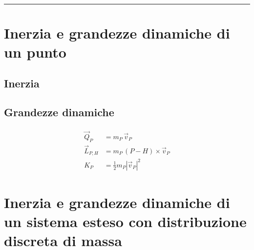 \documentclass[letterpaper,10pt,italian]{jupyterBook}
\begin{document}
\bigskip\hrule\bigskip


\sphinxstepscope




\section{Inerzia e grandezze dinamiche di un punto}
\label{\detokenize{ch/mechanics/inertia-point:inerzia-e-grandezze-dinamiche-di-un-punto}}\label{\detokenize{ch/mechanics/inertia-point:physics-hs-mechanics-inertia-point}}\label{\detokenize{ch/mechanics/inertia-point::doc}}

\subsection{Inerzia}
\label{\detokenize{ch/mechanics/inertia-point:inerzia}}\label{\detokenize{ch/mechanics/inertia-point:physics-hs-mechanics-inertia-point-inertia}}

\subsection{Grandezze dinamiche}
\label{\detokenize{ch/mechanics/inertia-point:grandezze-dinamiche}}\label{\detokenize{ch/mechanics/inertia-point:physics-hs-mechanics-inertia-point-dynamical-quantities}}\begin{equation*}
\begin{split}\begin{aligned}
  \vec{Q}_P     & = m_P \, \vec{v}_P \\
  \vec{L}_{P,H} & = m_P \, (P - H) \times \vec{v}_P \\
   K_P          & = \frac{1}{2} m_P \left| \vec{v}_P \right|^2
\end{aligned}\end{split}
\end{equation*}
\sphinxstepscope




\section{Inerzia e grandezze dinamiche di un sistema esteso con distribuzione discreta di massa}
\label{\detokenize{ch/mechanics/inertia-points:inerzia-e-grandezze-dinamiche-di-un-sistema-esteso-con-distribuzione-discreta-di-massa}}\label{\detokenize{ch/mechanics/inertia-points:physics-hs-mechanics-inertia-points}}\label{\detokenize{ch/mechanics/inertia-points::doc}}
\end{document}

